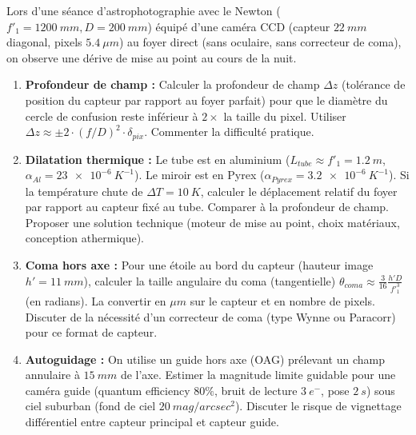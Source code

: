 \documentclass[11pt]{article}
\begin{document}
\begin{exercice}
Lors d'une séance d'astrophotographie avec le Newton ($f'_1=\SI{1200}{mm}, D=\SI{200}{mm}$) équipé d'une caméra CCD (capteur $\SI{22}{mm}$ diagonal, pixels $\SI{5,4}{\mu m}$) au foyer direct (sans oculaire, sans correcteur de coma), on observe une dérive de mise au point au cours de la nuit.
\begin{enumerate}
    \item \textbf{Profondeur de champ :} Calculer la profondeur de champ $\Delta z$ (tolérance de position du capteur par rapport au foyer parfait) pour que le diamètre du cercle de confusion reste inférieur à $2 \times$ la taille du pixel. Utiliser $\Delta z \approx \pm 2 \cdot (f/D)^2 \cdot \delta_{pix}$. Commenter la difficulté pratique.
    \item \textbf{Dilatation thermique :} Le tube est en aluminium ($L_{tube} \approx f'_1 = \SI{1,2}{m}$, $\alpha_{Al} = \SI{23e-6}{K^{-1}}$). Le miroir est en Pyrex ($\alpha_{Pyrex} = \SI{3,2e-6}{K^{-1}}$). Si la température chute de $\Delta T = \SI{10}{K}$, calculer le déplacement relatif du foyer par rapport au capteur fixé au tube. Comparer à la profondeur de champ. Proposer une solution technique (moteur de mise au point, choix matériaux, conception athermique).
    \item \textbf{Coma hors axe :} Pour une étoile au bord du capteur (hauteur image $h' = \SI{11}{mm}$), calculer la taille angulaire du coma (tangentielle) $\theta_{coma} \approx \frac{3}{16} \frac{h' D}{f'^3_1}$ (en radians). La convertir en $\mu m$ sur le capteur et en nombre de pixels. Discuter de la nécessité d'un correcteur de coma (type Wynne ou Paracorr) pour ce format de capteur.
    \item \textbf{Autoguidage :} On utilise un guide hors axe (OAG) prélevant un champ annulaire à $\SI{15}{mm}$ de l'axe. Estimer la magnitude limite guidable pour une caméra guide (quantum efficiency $80\%$, bruit de lecture $\SI{3}{e^-}$, pose $\SI{2}{s}$) sous ciel suburban (fond de ciel $\SI{20}{mag/arcsec^2}$). Discuter le risque de vignettage différentiel entre capteur principal et capteur guide.
\end{enumerate}
\end{exercice}
\end{document}
